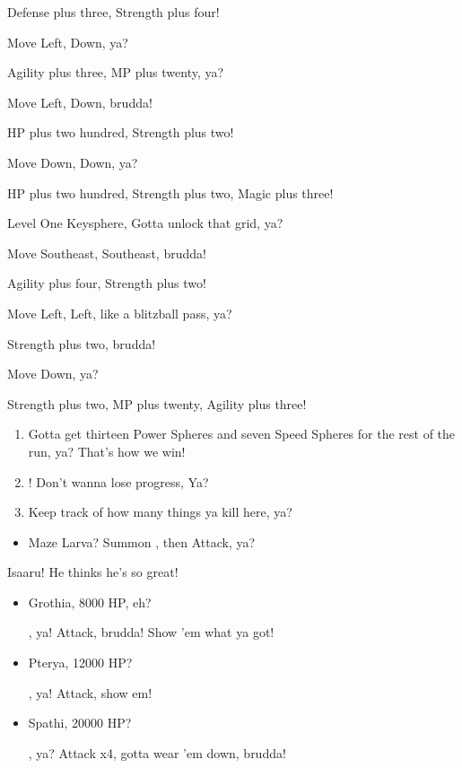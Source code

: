 \begin{spheregrid}
\begin{itemize}
\begin{itemize}
\begin{multicols}{2}
\item Defense plus three, Strength plus four!
\item Move Left, Down, ya?
\item Agility plus three, MP plus twenty, ya?
\item Move Left, Down, brudda!
\item HP plus two hundred, Strength plus two!
\item Move Down, Down, ya?
\item HP plus two hundred, Strength plus two, Magic plus three!
\item Level One Keysphere, Gotta unlock that grid, ya?
\item Move Southeast, Southeast, brudda!
\item Agility plus four, Strength plus two!
\item Move Left, Left, like a blitzball pass, ya?
\item Strength plus two, brudda!
\item Move Down, ya?
\item Strength plus two, MP plus twenty, Agility plus three!
\end{multicols}
\end{itemize}
\end{itemize}
\end{spheregrid}
\begin{enumerate}[resume]
\item Gotta get thirteen Power Spheres and seven Speed Spheres for the rest of the run, ya? That's how we win!
\item \save! Don't wanna lose progress, Ya?
\item Keep track of how many things ya kill here, ya?
\end{enumerate}
\begin{encounters}
\begin{itemize}
\item Maze Larva? Summon \ixion, then Attack, ya?
\end{itemize}
\end{encounters}
\begin{battle}{Isaaru! He thinks he's so great!}
\begin{itemize}
\item Grothia, 8000 HP, eh?
\begin{itemize}
\summon{\bahamut}, ya!
\bahamutf Attack, brudda! Show 'em what ya got!
\end{itemize}
\item Pterya, 12000 HP?
\begin{itemize}
\summon{\bahamut}, ya!
\bahamutf Attack, show em!
\end{itemize}
\item Spathi, 20000 HP?
\begin{itemize}
\summon{\ixion}, ya?
\ixionf Attack x4, gotta wear 'em down, brudda!
\end{itemize}
\end{itemize}
\end{battle}
